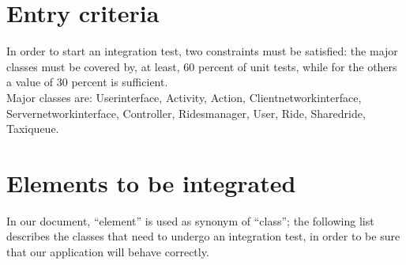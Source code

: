 \section{Entry criteria}
In order to start an integration test, two constraints must be satisfied:
the major classes must be covered by, at least, 60 percent of unit tests, 
while for the others a value of 30 percent is sufficient.\\
Major classes are: Userinterface, Activity, Action, Clientnetworkinterface,
Servernetworkinterface, Controller, Ridesmanager, User, Ride, Sharedride,
Taxiqueue.

\section{Elements to be integrated}
In our document, ``element'' is used as synonym of ``class'';
the following list describes the classes that need to undergo an integration test, 
in order to be sure that our application will behave correctly.
